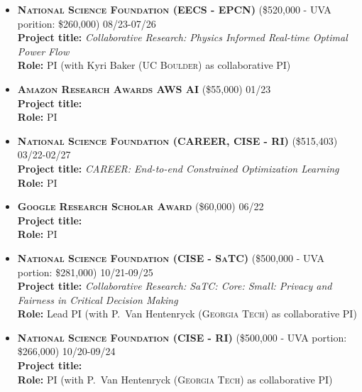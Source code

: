 \begin{itemize}
	\item
	\textbf{\textsc{National Science Foundation (EECS - EPCN)}}
	(\$520,000 - UVA porition: \$260,000)
	\hfill \textsc{08/23-07/26}\\
	{\bf Project title:} 
	{\em Collaborative Research: Physics Informed Real-time Optimal Power Flow}\\
	{\bf Role:} PI (with Kyri Baker (\textsc{UC Boulder}) as collaborative PI)
	
	\item
	\textbf{\textsc{Amazon Research Awards AWS AI}}
	(\$55,000)
	\hfill\textsc{01/23}\\
	{\bf Project title:} \\
	{\bf Role:} PI

	\item
	\textbf{\textsc{National Science Foundation (CAREER, CISE - RI)}}
	(\$515,403)
	\hfill\textsc{03/22-02/27}\\
	{\bf Project title:} 
	{\em CAREER: End-to-end Constrained Optimization Learning}\\
	{\bf Role:} PI

	\item
	\textbf{\textsc{Google Research Scholar Award}}
	(\$60,000)
	\hfill\textsc{06/22}\\
	{\bf Project title:} \\
	{\bf Role:} PI

	\item
	\textbf{\textsc{National Science Foundation (CISE - SaTC)}}
	(\$500,000 - UVA portion: \$281,000)
	\hfill\textsc{10/21-09/25}\\
	{\bf Project title:} 
	{\em Collaborative Research: SaTC: Core: Small: Privacy and Fairness in Critical Decision Making}\\
	{\bf Role:} Lead PI (with P.~Van Hentenryck (\textsc{Georgia Tech}) as collaborative PI)

	\item
	\textbf{\textsc{National Science Foundation (CISE - RI)}}
	(\$500,000 - UVA portion: \$266,000)
	\hfill\textsc{10/20-09/24}\\
	{\bf Project title:} 
	\\
	{\bf Role:} PI (with P.~Van Hentenryck (\textsc{Georgia Tech}) as collaborative PI)


\end{itemize}
